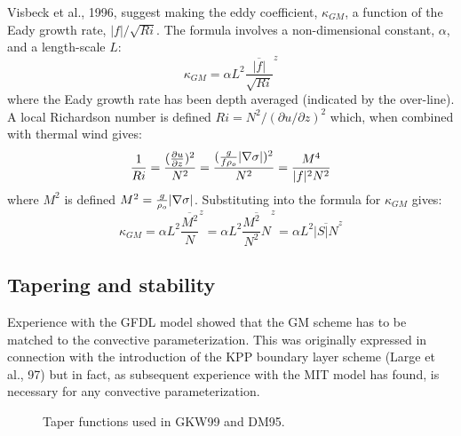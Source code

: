Visbeck et al., 1996, suggest making the eddy coefficient,
$\kappa_{GM}$, a function of the Eady growth rate,
$|f|/\sqrt{Ri}$. The formula involves a non-dimensional constant,
$\alpha$, and a length-scale $L$:
\begin{displaymath}
\kappa_{GM} = \alpha L^2 \overline{ \frac{|f|}{\sqrt{Ri}} }^z
\end{displaymath}
where the Eady growth rate has been depth averaged (indicated by the
over-line). A local Richardson number is defined $Ri = N^2 / (\partial
u/\partial z)^2$ which, when combined with thermal wind gives:
\begin{displaymath}
\frac{1}{Ri} = \frac{(\frac{\partial u}{\partial z})^2}{N^2} =
\frac{ ( \frac{g}{f \rho_o} | {\bf \nabla} \sigma | )^2 }{N^2} =
\frac{ M^4 }{ |f|^2 N^2 }
\end{displaymath}
where $M^2$ is defined $M^2 = \frac{g}{\rho_o} |{\bf \nabla} \sigma|$.
Substituting into the formula for $\kappa_{GM}$ gives:
\begin{displaymath}
\kappa_{GM} = \alpha L^2 \overline{ \frac{M^2}{N} }^z =
\alpha L^2 \overline{ \frac{M^2}{N^2} N }^z =
\alpha L^2 \overline{ |S| N }^z
\end{displaymath}


\subsection{Tapering and stability}

Experience with the GFDL model showed that the GM scheme has to be
matched to the convective parameterization. This was originally
expressed in connection with the introduction of the KPP boundary
layer scheme (Large et al., 97) but in fact, as subsequent experience
with the MIT model has found, is necessary for any convective
parameterization.


\begin{figure}
\begin{center}
\end{center}
\caption{Taper functions used in GKW99 and DM95.}
\label{fig:tapers}
\end{figure}

